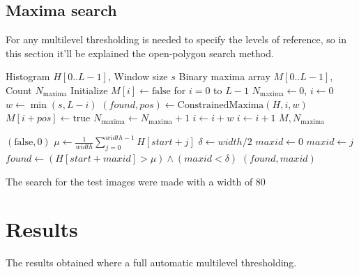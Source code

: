 \documentclass[pdflatex,sn-mathphys-num]{sn-jnl}
\begin{document}
  \subsection{Maxima search}
  For any multilevel thresholding is needed to specify the levels of reference, 
  so in this section it'll be explained the open-polygon search method.

  \begin{algorithm}
    \caption{Complete Histogram Maxima Detection}
    \begin{algorithmic}[1]
    \Require Histogram $H[0..L-1]$, Window size $s$
    \Ensure Binary maxima array $M[0..L-1]$, Count $N_{\text{maxima}}$
    \State Initialize $M[i] \gets \text{false}$ for $i = 0$ to $L-1$
    \State $N_{\text{maxima}} \gets 0$, $i \gets 0$
        \State $w \gets \min(s, L - i)$
        \State $(found, pos) \gets \text{ConstrainedMaxima}(H, i, w)$
            \State $M[i + pos] \gets \text{true}$
            \State $N_{\text{maxima}} \gets N_{\text{maxima}} + 1$
            \State $i \gets i + w$ 
        \Else
            \State $i \gets i + 1$ 
        \EndIf
    \EndWhile
    \State \Return $M, N_{\text{maxima}}$
    \end{algorithmic}
    \label{alg:complete_maxima}
    \end{algorithm}

    \begin{algorithmic}[1]
         \Return $(\text{false}, 0)$ \EndIf
        \State $\mu \gets \frac{1}{width} \sum_{j=0}^{width-1} H[start + j]$ 
        \State $\delta \gets width / 2$ 
        \State $maxid \gets 0$
                \State $maxid \gets j$
            \EndIf
        \EndFor
        \State $found \gets (H[start + maxid] > \mu) \land (maxid < \delta)$
        \State \Return $(found, maxid)$
    \EndFunction
    \end{algorithmic}

  The search for the test images were made with a width of 80


  \section{Results}
  The results obtained where a full automatic multilevel thresholding.
\end{document}
